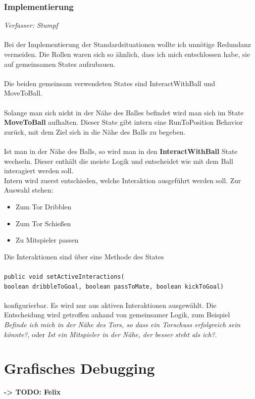 \documentclass[fontsize=12pt,a4paper,final]{scrartcl}[2003/01/01]
\begin{document}
\subsubsection{Implementierung}
\textit{Verfasser: Stumpf}\\
\\
Bei der Implementierung der Standardsituationen wollte ich unnötige Redundanz vermeiden. Die Rollen waren sich so ähnlich, dass ich mich entschlossen habe, sie auf gemeinsamen States aufzubauen.\\
\\
Die beiden gemeinsam verwendeten States sind InteractWithBall und MoveToBall.\\
\\
Solange man sich nicht in der Nähe des Balles befindet wird man sich im State \textbf{MoveToBall} aufhalten. Dieser State gibt intern eine RunToPosition Behavior zurück, mit dem Ziel sich in die Nähe des Balls zu begeben.\\
\\
Ist man in der Nähe des Balls, so wird man in den \textbf{InteractWithBall} State wechseln. Dieser enthält die meiste Logik und entscheidet wie mit dem Ball interagiert werden soll.\\ 
Intern wird zuerst entschieden, welche Interaktion ausgeführt werden soll. Zur Auswahl stehen:
\begin{itemize}
\item Zum Tor Dribblen
\item Zum Tor Schießen
\item Zu Mitspieler passen
\end{itemize}
Die Interaktionen sind über eine Methode des States \\
\\
\texttt{public void setActiveInteractions(\\boolean dribbleToGoal, boolean passToMate, boolean kickToGoal)}\\
\\
konfigurierbar. Es wird nur aus aktiven Interaktionen ausgewählt.
Die Entscheidung wird getroffen anhand von gemeinsamer Logik, zum Beispiel \textit{\glqq Befinde ich mich in der Nähe des Tors, so dass ein Torschuss erfolgreich sein könnte?\grqq}, oder \textit{\glqq Ist ein Mitspieler in der Nähe, der besser steht als ich?\grqq}.

\section{Grafisches Debugging}\label{se:Grafisches Debugging}
\textbf{-> TODO: Felix}
\end{document}
